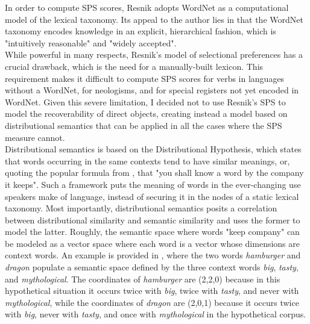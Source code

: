 In order to compute SPS scores, Resnik adopts WordNet \parencite{beckwith1991wordnet,Miller1995} as a computational model of the lexical taxonomy. Its appeal to the author \parencite[32]{Resnik1993} lies in that the WordNet taxonomy encodes knowledge in an explicit, hierarchical fashion, which is "intuitively reasonable" and "widely accepted".\\ While powerful in many respects, Resnik's model of selectional preferences has a crucial drawback, which is the need for a manually-built lexicon. This requirement makes it difficult to compute SPS scores for verbs in languages without a WordNet, for neologisms, and for special registers not yet encoded in WordNet. Given this severe limitation, I decided not to use Resnik's SPS to model the recoverability of direct objects, creating instead a model based on distributional semantics \parencite{Lenci:2018} that can be applied in all the cases where the SPS measure cannot.\\
Distributional semantics is based on the Distributional Hypothesis, which states that words occurring in the same contexts tend to have similar meanings, or, quoting the popular formula from \textcite{firth1957synopsis}, that "you shall know a word by the company it keeps". Such a framework puts the meaning of words in the ever-changing use speakers make of language, instead of securing it in the nodes of a static lexical taxonomy. Most importantly, distributional semantics posits a correlation between distributional similarity and semantic similarity and uses the former to model the latter. Roughly, the semantic space where words "keep company" can be modeled as a vector space where each word is a vector whose dimensions are context words. An example is provided in , where the two words \textit{hamburger} and \textit{dragon} populate a semantic space defined by the three context words \textit{big}, \textit{tasty}, and \textit{mythological}. The coordinates of \textit{hamburger} are (2,2,0) because in this hypothetical situation it occurs twice with \textit{big}, twice with \textit{tasty}, and never with \textit{mythological}, while the coordinates of \textit{dragon} are (2,0,1) because it occurs twice with \textit{big}, never with \textit{tasty}, and once with \textit{mythological} in the hypothetical corpus.

